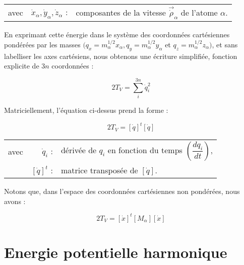\begin{flushleft}
	\begin{tabular}{@{}lrp{10cm}}
		avec & $\dot{x}_{\alpha}, \dot{y}_{\alpha}, \dot{z}_{\alpha}$ : & composantes de la vitesse $\stackrel{\rightarrow}{\dot{\rho}}_{\alpha}$ de l'atome $\alpha$. 
	\end{tabular}
\end{flushleft}

En exprimant cette énergie dans le système des coordonnées cartésiennes pondérées par les masses $(q_x = m^{1/2}_{\alpha}x_{\alpha}, q_y = m^{1/2}_{\alpha}y_{\alpha}$ et $q_z = m^{1/2}_{\alpha}z_{\alpha} )$, et sans labelliser les axes cartésiens, nous obtenons une écriture simplifiée, fonction explicite de $3n$ coordonnées :

\begin{equation}
2T_V = \sum^{3n}_i \dot{q}^2_i
\end{equation}

Matriciellement, l'équation ci-dessus prend la forme :

\begin{equation}
2T_V = \left[\dot{q}\right]^t\left[\dot{q}\right]
\end{equation}

\begin{flushleft}
	\begin{tabular}{@{}lrp{10cm}}
		avec & $\dot{q}_i$ : & dérivée de $q_{i}$ en fonction du temps $\left( \dfrac{dq_i}{dt} \right)$,\\
		& $\left[\dot{q}\right]^t$ : & matrice transposée de $\left[\dot{q}\right]$.
	\end{tabular}
\end{flushleft}

Notons que, dans l'espace des coordonnées cartésiennes non pondérées, nous avons :

\begin{equation}
2T_V = \left[\dot{x}\right]^t \left[M_{\alpha}\right] \left[\dot{x}\right]
\label{eq_nrj_cin_vib}
\end{equation}

\section{Energie potentielle harmonique}\label{E-harmonique}

